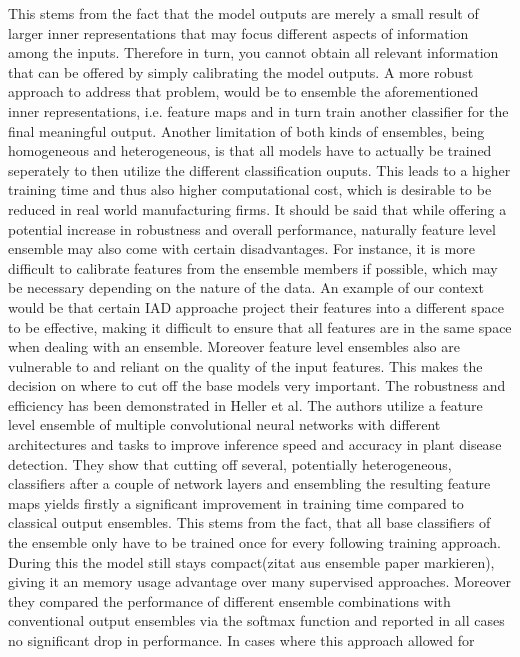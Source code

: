 This stems from the fact that the model outputs are merely a small result of larger inner representations that may focus different aspects 
of information among the inputs. Therefore in turn, you cannot obtain all relevant information that can be offered by simply calibrating the 
model outputs. A more robust approach to address that problem, would be to ensemble the aforementioned inner representations, i.e. feature maps 
and in turn train another classifier for the final meaningful output.
Another limitation of both kinds of ensembles, being homogeneous and heterogeneous, is that all models have to actually be trained 
seperately to then utilize the different classification ouputs. This leads to a higher training time and thus also higher computational 
cost, which is desirable to be reduced in real world manufacturing firms.
It should be said that while offering a potential increase in robustness and overall performance, naturally feature level ensemble may also 
come with certain disadvantages. For instance, it is more difficult to calibrate features from the ensemble members if possible, which may 
be necessary depending on the nature of the data. An example of our context would be that certain IAD approache project their features into a 
different space to be effective, making it difficult to ensure that all features are in the same space when dealing with an ensemble. 
Moreover feature level ensembles also are vulnerable to and reliant on the quality of the input features. This makes the decision on where 
to cut off the base models very important.
The robustness and efficiency has been demonstrated in Heller et al. \cite{EnsembleHeller2023} The authors utilize a feature level ensemble of multiple 
convolutional neural networks with different architectures and tasks to improve inference speed and accuracy in plant disease detection.
They show that cutting off several, potentially heterogeneous, classifiers after a couple of network layers and ensembling the 
resulting feature maps yields firstly a significant improvement in training time compared to classical output ensembles. This stems from 
the fact, that all base classifiers of the ensemble only have to be trained once for every following training approach. During this the 
model still stays compact(zitat aus ensemble paper markieren), giving it an memory usage advantage over many supervised approaches. 
Moreover they compared the performance of different ensemble combinations with conventional 
output ensembles via the softmax function and reported in all cases no significant drop in performance. In cases where this approach allowed for 
